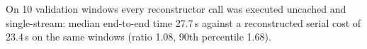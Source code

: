 On 10 validation windows every reconstructor call was executed uncached and single-stream: median end-to-end time 27.7\,s against a reconstructed serial cost of 23.4\,s on the same windows (ratio 1.08, 90th percentile 1.68).

